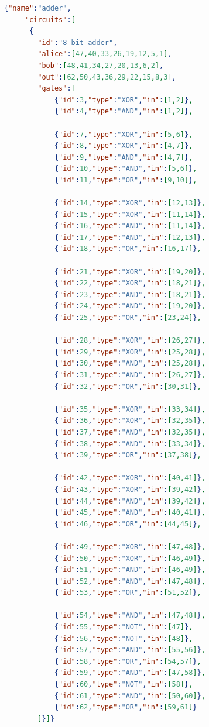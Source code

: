 \documentclass[12pt]{article}
\begin{document}
\begin{lstlisting}[language=json,firstnumber=1]
    {"name":"adder",
     "circuits":[
      {
        "id":"8 bit adder",
        "alice":[47,40,33,26,19,12,5,1],
        "bob":[48,41,34,27,20,13,6,2],
        "out":[62,50,43,36,29,22,15,8,3],
        "gates":[
            {"id":3,"type":"XOR","in":[1,2]},
            {"id":4,"type":"AND","in":[1,2]},

            {"id":7,"type":"XOR","in":[5,6]},
            {"id":8,"type":"XOR","in":[4,7]},
            {"id":9,"type":"AND","in":[4,7]},
            {"id":10,"type":"AND","in":[5,6]},
            {"id":11,"type":"OR","in":[9,10]},

            {"id":14,"type":"XOR","in":[12,13]},
            {"id":15,"type":"XOR","in":[11,14]},
            {"id":16,"type":"AND","in":[11,14]},
            {"id":17,"type":"AND","in":[12,13]},
            {"id":18,"type":"OR","in":[16,17]},
            
            {"id":21,"type":"XOR","in":[19,20]},
            {"id":22,"type":"XOR","in":[18,21]},
            {"id":23,"type":"AND","in":[18,21]},
            {"id":24,"type":"AND","in":[19,20]},
            {"id":25,"type":"OR","in":[23,24]},
            
            {"id":28,"type":"XOR","in":[26,27]},
            {"id":29,"type":"XOR","in":[25,28]},
            {"id":30,"type":"AND","in":[25,28]},
            {"id":31,"type":"AND","in":[26,27]},
            {"id":32,"type":"OR","in":[30,31]},
            
            {"id":35,"type":"XOR","in":[33,34]},
            {"id":36,"type":"XOR","in":[32,35]},
            {"id":37,"type":"AND","in":[32,35]},
            {"id":38,"type":"AND","in":[33,34]},
            {"id":39,"type":"OR","in":[37,38]},
            
            {"id":42,"type":"XOR","in":[40,41]},
            {"id":43,"type":"XOR","in":[39,42]},
            {"id":44,"type":"AND","in":[39,42]},
            {"id":45,"type":"AND","in":[40,41]},
            {"id":46,"type":"OR","in":[44,45]},
            
            {"id":49,"type":"XOR","in":[47,48]},
            {"id":50,"type":"XOR","in":[46,49]},
            {"id":51,"type":"AND","in":[46,49]},
            {"id":52,"type":"AND","in":[47,48]},
            {"id":53,"type":"OR","in":[51,52]},
            
            {"id":54,"type":"AND","in":[47,48]},
            {"id":55,"type":"NOT","in":[47]},
            {"id":56,"type":"NOT","in":[48]},
            {"id":57,"type":"AND","in":[55,56]},
            {"id":58,"type":"OR","in":[54,57]},
            {"id":59,"type":"AND","in":[47,58]},
            {"id":60,"type":"NOT","in":[58]},
            {"id":61,"type":"AND","in":[50,60]},
            {"id":62,"type":"OR","in":[59,61]}
        ]}]}
    \end{lstlisting}
\end{document}
